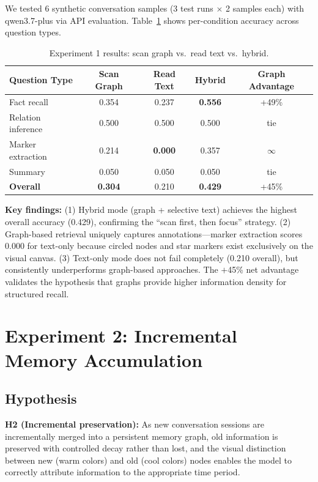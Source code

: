 \documentclass[11pt,a4paper]{article}
\begin{document}
We tested 6 synthetic conversation samples (3 test runs $\times$ 2 samples each) with qwen3.7-plus via API evaluation. Table~\ref{tab:exp1_res} shows per-condition accuracy across question types.

\begin{table}[h]
\centering\footnotesize
\caption{Experiment 1 results: scan graph vs.\ read text vs.\ hybrid.}
\label{tab:exp1_res}
\begin{tabular}{lcccc}
\toprule
\textbf{Question Type} & \textbf{Scan Graph} & \textbf{Read Text} & \textbf{Hybrid} & \textbf{Graph Advantage} \\
\midrule
Fact recall            & 0.354 & 0.237 & \textbf{0.556} & +49\% \\
Relation inference     & 0.500 & 0.500 & 0.500          & tie   \\
Marker extraction      & 0.214 & \textbf{0.000} & 0.357        & $\infty$ \\
Summary                & 0.050 & 0.050 & 0.050          & tie   \\
\midrule
\textbf{Overall}       & \textbf{0.304} & 0.210 & \textbf{0.429} & +45\% \\
\bottomrule
\end{tabular}
\end{table}

\textbf{Key findings:} (1) Hybrid mode (graph + selective text) achieves the highest overall accuracy (0.429), confirming the ``scan first, then focus'' strategy. (2) Graph-based retrieval uniquely captures annotations---marker extraction scores 0.000 for text-only because circled nodes and star markers exist exclusively on the visual canvas. (3) Text-only mode does not fail completely (0.210 overall), but consistently underperforms graph-based approaches. The $+$45\% net advantage validates the hypothesis that graphs provide higher information density for structured recall.


\section{Experiment 2: Incremental Memory Accumulation}

\subsection{Hypothesis}

\textbf{H2 (Incremental preservation):} As new conversation sessions are incrementally merged into a persistent memory graph, old information is preserved with controlled decay rather than lost, and the visual distinction between new (warm colors) and old (cool colors) nodes enables the model to correctly attribute information to the appropriate time period.
\end{document}
